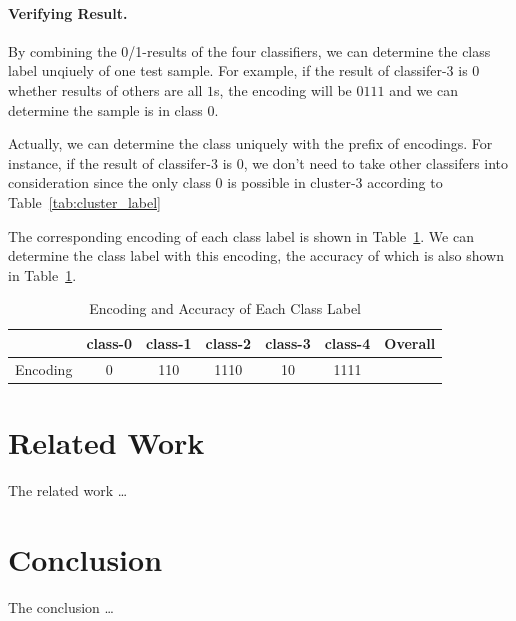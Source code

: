 \documentclass[sigplan,10pt,review]{acmart}\settopmatter{printfolios=true,printccs=false,printacmref=false}
\begin{document}
\paragraph{Verifying Result.}By combining the 0/1-results of the four classifiers, we can determine the class label unqiuely of one test sample.
For example, if the result of classifer-3 is $0$ whether results of others are all $1$s, the encoding will be $0111$ and we can determine the sample is in class $0$. 

Actually, we can determine the class uniquely with the prefix of encodings. 
For instance, if the result of classifer-3 is $0$, we don't need to take other classifers into consideration since the only class $0$ is possible in cluster-3 according to Table~\ref{tab:cluster_label}

The corresponding encoding of each class label is shown in Table~\ref{tab:encoding-and-accuarcy}. We can determine the class label with this encoding, the accuracy of which is also shown in Table~\ref{tab:encoding-and-accuarcy}.

\begin{table}[!htp]
	\begin{tabular}{|c|c|c|c|c|c|c|}
	\hline
	& class-0 & class-1 & class-2 & class-3 & class-4 & Overall \\
	\hline
	Encoding &0 & 110 & 1110 &10 & 1111 &\\
	\hline
	\end{tabular}
    \caption{Encoding and Accuracy of Each Class Label}
    \label{tab:encoding-and-accuarcy}
\end{table}


\section{Related Work}
The related work \dots

\section{Conclusion}
The conclusion \dots


% 
% 




\end{document}
